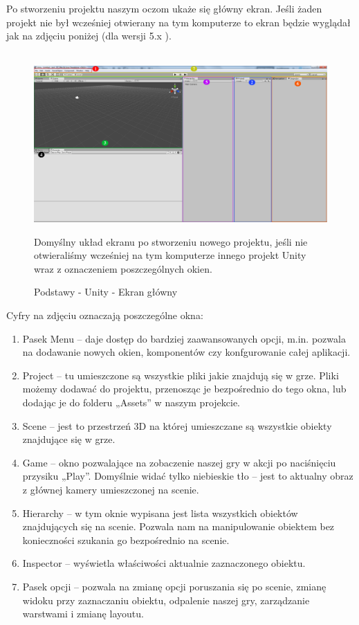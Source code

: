 \documentclass[openright]{xmgr}
\begin{document}
Po stworzeniu projektu naszym oczom ukaże się główny ekran. Jeśli żaden projekt nie był wcześniej otwierany na tym komputerze to ekran będzie wyglądał jak na zdjęciu poniżej (dla wersji 5.x ).
\\
\\
\begin{figure}[!htb]
    \begin{center}
    \includegraphics[scale=0.15]{Screeny/rodzial5screeny/ekran_glowny}
    \end{center}
    \caption{Podstawy - Unity - Ekran główny}
    Domyślny układ ekranu po stworzeniu nowego projektu, jeśli nie otwieraliśmy wcześniej na tym komputerze innego projekt Unity wraz z oznaczeniem poszczególnych okien.
\end{figure}

Cyfry na zdjęciu oznaczają poszczególne okna:

\begin{enumerate}
  \item Pasek Menu – daje dostęp do bardziej zaawansowanych opcji, m.in. pozwala na dodawanie nowych okien, komponentów czy konfgurowanie całej aplikacji.
  \item  Project – tu umieszczone są wszystkie pliki jakie znajdują się w grze. Pliki możemy dodawać do projektu, przenosząc je bezpośrednio do tego okna, lub dodając je do folderu „Assets” w naszym projekcie.
  \item Scene – jest to przestrzeń 3D na której umieszczane są wszystkie obiekty znajdujące się w grze.
  \item Game – okno pozwalające na zobaczenie naszej gry w akcji po naciśnięciu przysiku „Play”. Domyślnie widać tylko niebieskie tło – jest to aktualny obraz z głównej kamery umieszczonej na scenie.
  \item Hierarchy – w tym oknie wypisana jest lista wszystkich obiektów znajdujących się na scenie. Pozwala nam na manipulowanie obiektem bez konieczności szukania go bezpośrednio na scenie.
  \item Inspector – wyświetla właściwości aktualnie zaznaczonego obiektu.
  \item  Pasek opcji – pozwala na zmianę opcji poruszania się po scenie, zmianę widoku przy zaznaczaniu obiektu, odpalenie naszej gry, zarządzanie warstwami i zmianę layoutu.
\end{enumerate}
\end{document}
